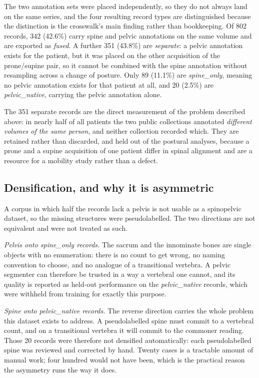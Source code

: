 \documentclass[aapm,mph,amsmath,amssymb,reprint,linenumbers]{revtex4-2}
\begin{document}
The two annotation sets were placed independently, so they do not always land on the same
series, and the four resulting record types are distinguished because the distinction is
the crosswalk's main finding rather than bookkeeping. Of 802 records, 342 (42.6\%) carry
spine and pelvic annotations on the same volume and are exported as \emph{fused}. A
further 351 (43.8\%) are \emph{separate}: a pelvic annotation exists for the patient, but
it was placed on the other acquisition of the prone/supine pair, so it cannot be combined
with the spine annotation without resampling across a change of posture. Only 89 (11.1\%)
are \emph{spine\_only}, meaning no pelvic annotation exists for that patient at all, and 20
(2.5\%) are \emph{pelvic\_native}, carrying the pelvic annotation alone.

The 351 separate records are the direct measurement of the problem described above: in
nearly half of all patients the two public collections annotated \emph{different volumes of
the same person}, and neither collection recorded which. They are retained rather than
discarded, and held out of the postural analyses, because a prone and a supine acquisition
of one patient differ in spinal alignment and are a resource for a mobility study rather
than a defect.

\subsection{Densification, and why it is asymmetric}

A corpus in which half the records lack a pelvis is not usable as a spinopelvic dataset,
so the missing structures were pseudolabelled. The two directions are not equivalent and
were not treated as such.

\emph{Pelvis onto spine\_only records.} The sacrum and the innominate bones are single
objects with no enumeration: there is no count to get wrong, no naming convention to
choose, and no analogue of a transitional vertebra. A pelvic segmenter can therefore be
trusted in a way a vertebral one cannot, and its quality is reported as held-out
performance on the \emph{pelvic\_native} records, which were withheld from training for
exactly this purpose.

\emph{Spine onto pelvic\_native records.} The reverse direction carries the whole problem
this dataset exists to address. A pseudolabelled spine must commit to a vertebral count,
and on a transitional vertebra it will commit to the commoner reading. Those 20 records
were therefore not densified automatically: each pseudolabelled spine was reviewed and
corrected by hand. Twenty cases is a tractable amount of manual work; four hundred would
not have been, which is the practical reason the asymmetry runs the way it does.
\end{document}
